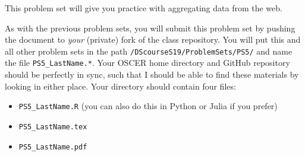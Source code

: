 \documentclass[12pt,english]{exam}
\begin{document}
This problem set will give you practice with aggregating data from the web.

As with the previous problem sets, you will submit this problem set by pushing the document to \emph{your} (private) fork of the class repository. You will put this and all other problem sets in the path \texttt{/DScourseS19/ProblemSets/PS5/} and name the file \texttt{PS5\_LastName.*}. Your OSCER home directory and GitHub repository should be perfectly in sync, such that I should be able to find these materials by looking in either place. Your directory should contain four files:
\begin{itemize}
    \item \texttt{PS5\_LastName.R} (you can also do this in Python or Julia if you prefer)
    \item \texttt{PS5\_LastName.tex}
    \item \texttt{PS5\_LastName.pdf}
\end{itemize}
\end{document}
